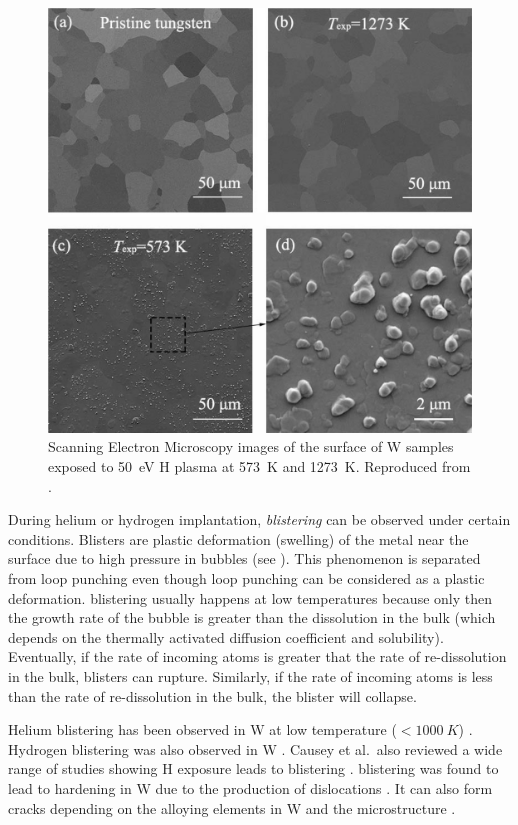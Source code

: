 \begin{figure}
    \centering
    \includegraphics[width=\linewidth]{Figures/Chapter1/h_blisters_in_tungsten.jpg}
    \caption{Scanning Electron Microscopy images of the surface of W samples exposed to \SI{50}{eV} H plasma at \SI{573}{K} and \SI{1273}{K}. Reproduced from \cite{chen_irradiation_2019}.}
\end{figure}

During helium or hydrogen implantation, \emph{\gls{blistering}} can be observed under certain conditions.
Blisters are plastic deformation (swelling) of the metal near the surface due to high pressure in bubbles (see ).
This phenomenon is separated from \gls{loop punching} even though \gls{loop punching} can be considered as a plastic deformation.
\Gls{blistering} usually happens at low temperatures because only then the growth rate of the bubble is greater than the dissolution in the bulk (which depends on the thermally activated diffusion coefficient and solubility).
Eventually, if the rate of incoming atoms is greater that the rate of re-dissolution in the bulk, blisters can rupture.
Similarly, if the rate of incoming atoms is less than the rate of re-dissolution in the bulk, the blister will collapse.

Helium \gls{blistering} has been observed in \gls{W} at low temperature ($< \SI{1000}{K}$) .
Hydrogen \gls{blistering} was also observed in \gls{W} .
Causey et al.\ also reviewed a wide range of studies showing H exposure leads to \gls{blistering} .
\Gls{blistering} was found to lead to hardening in W due to the production of dislocations .
It can also form cracks depending on the alloying elements in W and the microstructure .


